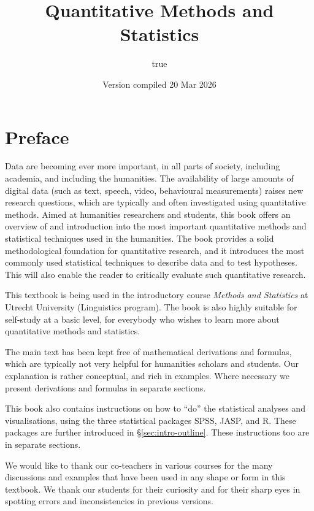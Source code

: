 \documentclass[
]{book}
\title{Quantitative Methods and Statistics}
\author{true}
\date{Version compiled 20 Mar 2026}
\begin{document}
\maketitle

{
\setcounter{tocdepth}{1}
\tableofcontents
}
\chapter*{Preface}\label{preface}

Data are becoming ever more important, in all parts of society, including academia, and including the humanities. The availability of large amounts of digital data (such as text, speech, video, behavioural measurements) raises new research questions, which are typically and often investigated using quantitative methods.
Aimed at humanities researchers and students, this book offers an overview of and introduction into the most important quantitative methods and statistical techniques used in the humanities. The book provides a solid methodological foundation for quantitative research, and it introduces the most commonly used statistical techniques to describe data and to test hypotheses. This will also enable the reader to critically evaluate such quantitative research.

This textbook is being used in the introductory course \emph{Methods and Statistics} at Utrecht University (Linguistics program). The book is also highly suitable for self-study at a basic level, for everybody who wishes to learn more about quantitative methods and statistics.

The main text has been kept free of mathematical derivations and formulas, which are typically not very helpful for humanities scholars and students. Our explanation is rather conceptual, and rich in examples. Where necessary we present derivations and formulas in separate sections.

This book also contains instructions on how to ``do'' the statistical analyses and visualisations, using the three statistical packages SPSS, JASP, and R. These packages are further introduced in §\ref{sec:intro-outline}. These instructions too are in separate sections.

We would like to thank our co-teachers in various courses for the many discussions and examples that have been used in any shape or form in this textbook. We thank our students for their curiosity and for their sharp eyes in spotting errors and inconsistencies in previous versions.
\end{document}
